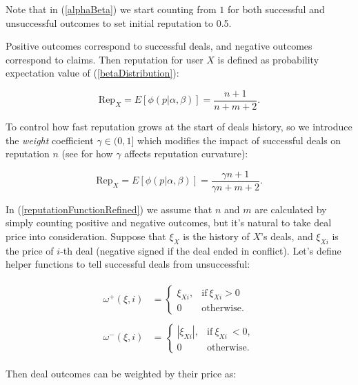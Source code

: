 \documentclass[11pt]{article}
\begin{document}
Note that in (\ref{alphaBeta}) we start counting from $ 1 $ for both successful and unsuccessful outcomes to set initial reputation to 0.5.

Positive outcomes correspond to successful deals, and negative outcomes correspond to claims. Then  reputation for user $ X $ is defined as probability expectation value of (\ref{betaDistribution}):

\begin{equation} \label{reputationFunction}
\text{Rep}_{X} = E[\phi(p | \alpha, \beta)] = \frac{n + 1}{n + m + 2}.
\end{equation}

To control how fast reputation grows at the start of deals history, so we introduce the \textit{weight} coefficient $ \gamma \in (0, 1] $ which modifies the impact of successful deals on reputation $ n $ (see \cite{josang2002beta} for how $ \gamma $ affects reputation curvature):

\begin{equation} \label{reputationFunctionRefined}
\text{Rep}_{X} = E[\phi(p | \alpha, \beta)] = \frac{\gamma n + 1}{\gamma n + m + 2}.
\end{equation}

In (\ref{reputationFunctionRefined}) we assume that $ n $ and $ m $ are calculated by simply counting positive and negative outcomes, but it's natural to take deal price into consideration. Suppose that $ \xi_{X} $ is the history of $ X $'s deals, and $ \xi_{Xi} $ is the price of $ i $-th deal (negative signed if the deal ended in conflict). Let's define helper functions to tell successful deals from unsuccessful:

\begin{align}
\begin{split}
\omega^{+}(\xi, i) {}& = \begin{cases} \xi_{Xi}, & \text{if}\ \xi_{Xi} > 0\, \\ 0 & \mbox{otherwise.} \end{cases}
\end{split} \\
\begin{split}
\omega^{-}(\xi, i) {}& = \begin{cases} |\xi_{Xi}|, & \text{if}\ \xi_{Xi}\ < 0, \\ 0 & \mbox{otherwise.} \end{cases}
\end{split}
\end{align}

Then deal outcomes can be weighted by their price as:
\end{document}
